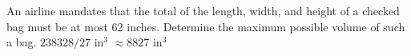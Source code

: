 {An airline mandates that the total of the length, width, and height of a checked bag must be at most 62 inches.  Determine the maximum possible volume of such a bag.
}
{
$238328/27$ in$^3$ $\approx 8827$ in$^3$
}
